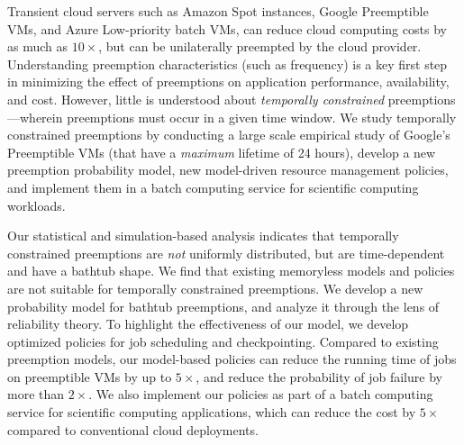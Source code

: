 Transient cloud servers such as Amazon Spot instances, Google Preemptible VMs, and Azure Low-priority batch VMs, can reduce cloud computing costs by as much as $10\times$, but can be unilaterally preempted by the cloud provider.
%
Understanding preemption characteristics (such as frequency) is a key first step in minimizing the effect of preemptions on application performance, availability, and cost.
%
However, little is understood about \emph{temporally constrained} preemptions---wherein preemptions must occur in a given time window.
%
We study temporally constrained preemptions by conducting a large scale empirical study of Google's Preemptible VMs (that have a  \emph{maximum} lifetime of 24 hours), develop a new preemption probability model, new  model-driven resource management policies, and implement them in a batch computing service for scientific computing workloads. 

%
Our statistical and simulation-based analysis indicates that temporally constrained preemptions are \emph{not} uniformly distributed, but are time-dependent and have a bathtub shape. 
%
We find that existing memoryless models and policies are not suitable for  temporally constrained preemptions. 
%
We develop a new probability model for bathtub preemptions, and analyze it through the lens of reliability theory. 
To highlight the effectiveness of our model, we develop optimized policies for job scheduling and checkpointing. 
Compared to existing preemption models, our model-based policies can reduce the running time of jobs on preemptible VMs by up to $5\times$, and reduce the probability of job failure by more than $2\times$. 
We also implement our policies as part of a batch computing service for scientific computing applications, which can reduce the cost by $5\times$ compared to conventional cloud deployments.



